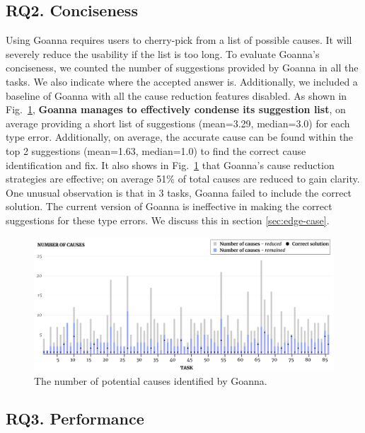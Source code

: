 	\subsection{RQ2. Conciseness}\label{sub:eval-conciseness}
 Using Goanna requires users to cherry-pick from a list of possible causes. It will severely reduce the usability if the list is too long. To evaluate Goanna's conciseness, we counted the number of suggestions provided by Goanna in all the tasks.  We also indicate where the accepted answer is. Additionally, we included a baseline of Goanna with all the cause reduction features disabled. As shown in Fig.~\ref{fig:conciseness}, \textbf{Goanna manages to effectively condense its suggestion list}, on average providing a short list of suggestions (mean=3.29, median=3.0) for each type error. Additionally, on average, the accurate cause can be found within the top 2 suggestions (mean=1.63, median=1.0) to find the correct cause identification and fix. It also shows in Fig.~\ref{fig:conciseness} that Goanna's cause reduction strategies are effective; on average 51\% of total causes are reduced to gain clarity. One unusual observation is that in 3 tasks, Goanna failed to include the correct solution. The current version of Goanna is ineffective in making the correct suggestions for these type errors. We discuss this in section \ref{sec:edge-case}. 
 
    \begin{figure}[ht!]
        \centering
        \includegraphics[width=\linewidth]{images/Conciseness}
        \caption{The number of potential causes identified by Goanna.}
        \label{fig:conciseness}
    \end{figure}



    \subsection{RQ3. Performance} \label{sub:eval-performacne}


